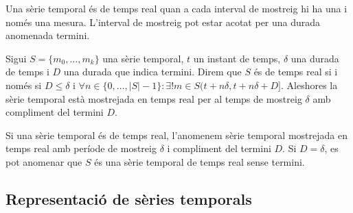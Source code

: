 Una sèrie temporal és de temps real quan a cada interval de mostreig hi ha una i només una mesura. L'interval de mostreig pot estar acotat per una durada anomenada termini.

\begin{definition}
  Sigui $S=\{m_0,\ldots,m_k\}$ una sèrie temporal, $t$ un instant de
  temps, $\delta$ una durada de temps i $D$ una durada que indica
  termini. Direm que $S$ és de temps real si i només si $D\leq\delta$
  i $\forall n\in\{0,\ldots,|S|-1\}: \exists!m \in
  S(t+n\delta,t+n\delta+D]$.  Aleshores la sèrie temporal està
  mostrejada en temps real per al temps de mostreig $\delta$ amb
  compliment del termini $D$.
\end{definition}

Si una sèrie temporal és de temps real, l'anomenem  sèrie temporal mostrejada
en temps real amb període de mostreig $\delta$ i compliment del termini $D$.
Si $D=\delta$, es pot anomenar que $S$ és una sèrie temporal de temps real sense termini.






\subsection{Representació de sèries temporals}

